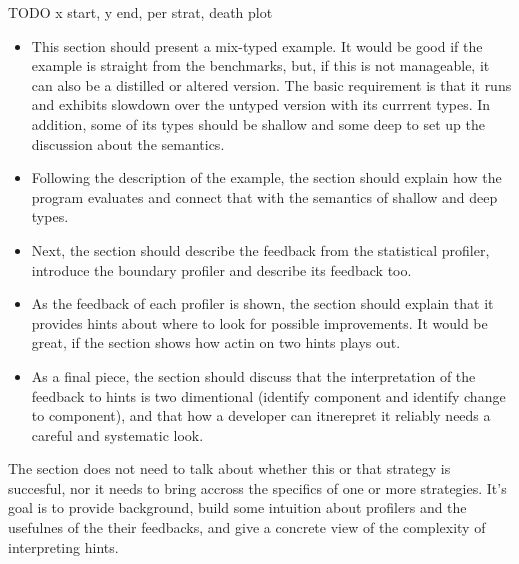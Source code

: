 TODO x start, y end, per strat, death plot

\begin{itemize}
  \item This section should present a mix-typed example. It would be good
    if the example is straight from the benchmarks, but, if this is not
    manageable, it can also be a distilled or altered version.  The basic
    requirement is that it runs and exhibits slowdown over the untyped
    version with its currrent types. In addition, some of its types should
    be shallow and some deep to set up the discussion about the
    semantics.
  \item Following the description of the example,  
    the section should explain how the program evaluates and connect that with the
    semantics of shallow and deep types. 
  \item Next, the section should describe the feedback from the statistical
    profiler, introduce the boundary profiler  and 
    describe its feedback too. 
  \item As the feedback of each profiler is shown, the section should 
    explain that it provides hints about where to look for
    possible improvements. It would be great, if the section shows how
    actin on two hints plays out.  
  \item As a final piece, the section should discuss that the
    interpretation
    of the feedback to hints is two dimentional (identify component and
    identify change to component), and that how a developer can itnerepret
    it reliably needs a careful and systematic look.
\end{itemize}


The section does not need to talk about whether this or that strategy is
succesful, nor it needs to bring accross the specifics of one or more
strategies. It's goal is to provide background, build some intuition about
profilers and the usefulnes of the their feedbacks, and give a concrete view of
 the complexity of interpreting hints.

